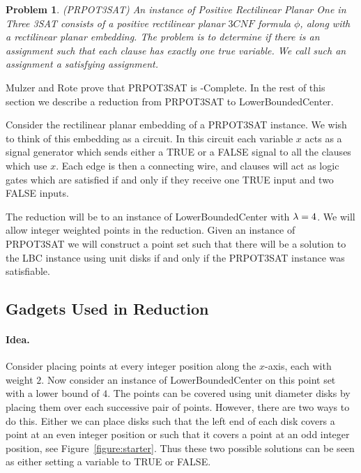 \ifx\STACS\undefined \documentclass[12pt]{article}\else \documentclass[runningheads,a4paper]{llncs}
\newcommand{\PRPOTSAT}{\Term{PRPOT3SAT}\xspace}
\newcommand{\True}{\Term{TRUE}\xspace}
\newcommand{\False}{\Term{FALSE}\xspace}
\newcommand{\LowerBoundedCenter}   {\PStyle{{Lower{}Bounded{}Center}}\xspace}
\newcommand{\lbc}{\PStyle{LBC}\xspace}
\newcommand{\PStyle}[1]{\textcolor{red25}{\textrm{\textsf{#1}}}}
\newtheorem{problem}[theorem]{Problem}}
\newcommand{\Term}[1]{\textsf{#1}}
\newcommand{\figref}[1]{Figure~\ref{figure:#1}}
\begin{document}
\begin{problem}(\PRPOTSAT) An instance of Positive Rectilinear Planar
    One in Three 3SAT consists of a positive rectilinear planar $3CNF$
    formula $\phi$, along with a rectilinear planar embedding.  The
    problem is to determine if there is an assignment such that each
    clause has exactly one true variable.  We call such an assignment
    a satisfying assignment.
\end{problem}

Mulzer and Rote \cite{mr-mwtnph-08} prove that \PRPOTSAT is
\NP-Complete.  In the rest of this section we describe a reduction
from \PRPOTSAT to \LowerBoundedCenter.


Consider the rectilinear planar embedding of a \PRPOTSAT instance.  We
wish to think of this embedding as a circuit.  In this circuit each
variable $x$ acts as a signal generator which sends either a \True or
a \False signal to all the clauses which use $x$.  Each edge is then a
connecting wire, and clauses will act as logic gates which are
satisfied if and only if they receive one \True input and two \False
inputs.

The reduction will be to an instance of \LowerBoundedCenter with
$\lambda=4$.  We will allow integer weighted points in the reduction.
Given an instance of \PRPOTSAT we will construct a point set such that
there will be a solution to the \lbc instance using unit disks if and
only if the \PRPOTSAT instance was satisfiable.

\subsection{Gadgets Used in Reduction}

\paragraph*{Idea.}
Consider placing points at every integer position along the $x$-axis,
each with weight $2$.  Now consider an instance of \LowerBoundedCenter
on this point set with a lower bound of $4$.  The points can be
covered using unit diameter disks by placing them over each successive
pair of points.  However, there are two ways to do this.  Either we
can place disks such that the left end of each disk covers a point at
an even integer position or such that it covers a point at an odd
integer position, see \figref{starter}.  Thus these two possible
solutions can be seen as either setting a variable to \True or \False.
\end{document}
